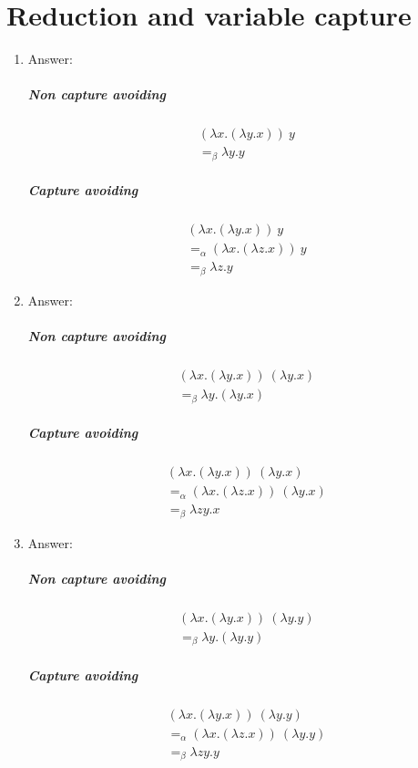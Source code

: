 \documentclass{article}
\begin{document}
\section{Reduction and variable capture}

\begin{enumerate}
	\item Answer:
		\subparagraph{Non capture avoiding}
			\begin{align*}
				&(\lambda x.(\lambda y.x))\ y &\\
				&=_{\beta} \lambda y.y &
			\end{align*}
		\subparagraph{Capture avoiding}
			\begin{align*}
				&(\lambda x.(\lambda y.x))\ y &\\
				&=_{\alpha} (\lambda x.(\lambda z.x))\ y &\\
				&=_{\beta} \lambda z.y &
			\end{align*}

	\item Answer: 
		\subparagraph{Non capture avoiding}
			\begin{align*}
				&(\lambda x.(\lambda y.x))\ (\lambda y.x) &\\
				&=_{\beta} \lambda y.(\lambda y.x)
			\end{align*}
		\subparagraph{Capture avoiding}
			\begin{align*}
				&(\lambda x.(\lambda y.x))\ (\lambda y.x) &\\
				&=_{\alpha} (\lambda x.(\lambda z.x))\ (\lambda y.x) &\\
				&=_{\beta} \lambda zy.x
			\end{align*}

	\item Answer: 
		\subparagraph{Non capture avoiding}
			\begin{align*}
				&(\lambda x.(\lambda y.x))\ (\lambda y.y) &\\
				&=_{\beta} \lambda y.(\lambda y.y)
			\end{align*}
		\subparagraph{Capture avoiding}
			\begin{align*}
				&(\lambda x.(\lambda y.x))\ (\lambda y.y) &\\
				&=_{\alpha} (\lambda x.(\lambda z.x))\ (\lambda y.y) &\\
				&=_{\beta} \lambda zy.y
			\end{align*}


\end{enumerate}
\end{document}
